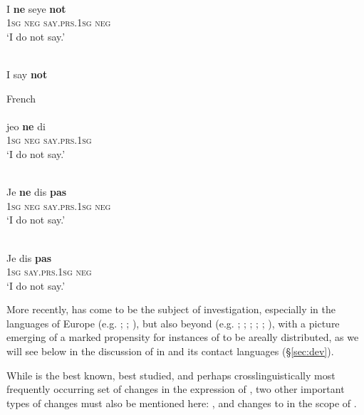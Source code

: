 \documentclass[output=paper]{langsci/langscibook}
\begin{document}
\\
\gll I \textbf{ne} seye \textbf{not}\\
     \textsc{1sg}  \textsc{neg} \textsc{\textup{say.}}\textsc{prs.1sg} \textsc{neg}  \\
\glt ‘I do not say.’


\\
 I say \textbf{not}\\
\z
\z

\ea\label{fr}
{{French} \citep[7]{Jespersen1917}}\\
\\
\gll jeo \textbf{ne} di\\
     \textsc{1sg} \textsc{neg} \textsc{\textup{say}}.\textsc{prs.1sg}  \\
\glt  ‘I do not say.’

\\
\gll Je \textbf{ne} dis \textbf{pas}\\
     \textsc{1sg} \textsc{neg} \textsc{\textup{say}}.\textsc{prs.1sg} \textsc{neg}  \\
\glt ‘I do not say.’

\\
\gll Je dis \textbf{pas}\\
     \textsc{1sg} \textsc{\textup{say}}.\textsc{prs.1sg} \textsc{neg}  \\
\glt ‘I do not say.’
\z
\z

More recently,  has come to be the subject of  investigation, especially in the languages of Europe (e.g. \citealt{BerniniRamat1992}; \citeyear{BerniniRamat1996}; \citealt{WillisBreitbarth2013}), but also beyond (e.g. \citealt{Lucas2007}; \citeyear{Lucas2009,Lucas2013}; \citealt{LucasLash2010}; \citealt{DevosAuwera2013}; \citealt{AuweraVossen2015}; \citeyear{AuweraVossen2016,AuweraVossen2017}), with a picture emerging of a marked propensity for instances of  to be areally distributed, as we will see below in the discussion of  in  and its contact languages (§\ref{sec:dev}).

While  is the best known, best studied, and perhaps crosslinguistically most frequently occurring set of changes in the expression of , two other important types of changes must also be mentioned here: , and changes to  in the scope of .
\end{document}

